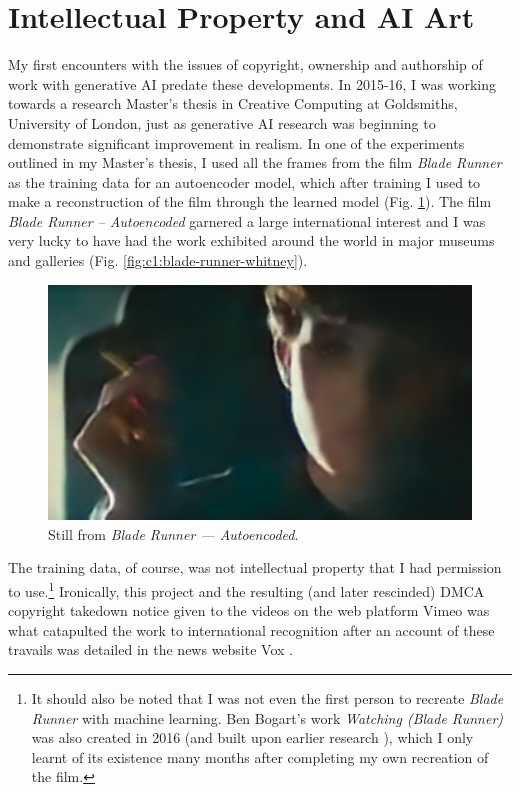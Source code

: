 \section{Intellectual Property and AI Art}

My first encounters with the issues of copyright, ownership and authorship of work with generative AI predate these developments. 
In 2015-16, I was working towards a research Master's thesis in Creative Computing at Goldsmiths, University of London, just as generative AI research was beginning to demonstrate significant improvement in realism. 
In one of the experiments outlined in my Master's thesis, I used all the frames from the film \textit{Blade Runner} as the training data for an autoencoder model, which after training I used to make a reconstruction of the film through the learned model \citep{broad2016autoencoding}  (Fig. \ref{fig:c1:blade-runner}).
The film \textit{Blade Runner -- Autoencoded} garnered a large international interest and I was very lucky to have had the work exhibited around the world in major museums and galleries \citep{broad2017autoencoding}  (Fig. \ref{fig:c1:blade-runner-whitney}).

\begin{figure}[!htb]
    \centering
    \captionsetup{justification=centering}
    \includegraphics[width=1\textwidth]{figures/c1_intro/blade_runner_still.png}
    \caption{Still from \textit{Blade Runner --- Autoencoded}.}
    \label{fig:c1:blade-runner}
\end{figure}

The training data, of course, was not intellectual property that I had permission to use.\footnote{It should also be noted that I was not even the first person to recreate \textit{Blade Runner} with machine learning. Ben Bogart's work \textit{Watching (Blade Runner)} was also created in 2016 \citep{bogart2016watching} (and built upon earlier research \citep{bogart2008memory,bogart2013context}), which I only learnt of its existence many months after completing my own recreation of the film.}
Ironically, this project and the resulting (and later rescinded) DMCA copyright takedown notice given to the videos on the web platform Vimeo was what catapulted the work to international recognition after an account of these travails was detailed in the news website Vox \citep{romano2016bladerunner}.

